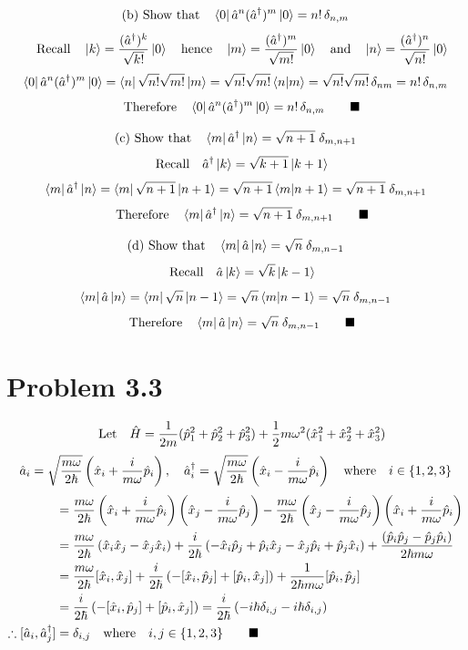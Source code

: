 \documentclass{amsart}
\begin{document}
\[\qq*{(b) Show that}\bra{0}\hat{a}^n(\hat{a}^\dagger)^m\ket{0} =n!\,\delta_{n,m}  \]
\[\qq{Recall} \ket{k}=\frac{(\hat{a}^\dagger)^k}{\sqrt{k!}}\ket{0}\qq{hence} \ket{m}=\frac{(\hat{a}^\dagger)^m}{\sqrt{m!}}\ket{0} \qq{and}\ket{n}=\frac{(\hat{a}^\dagger)^n}{\sqrt{n!}}\ket{0}\]
\[\bra{0}\hat{a}^n(\hat{a}^\dagger)^m\ket{0} =\bra{n}\sqrt{n!}\sqrt{m!}\ket{m}=\sqrt{n!}\sqrt{m!}\bra{n}\ket{m}=\sqrt{n!}\sqrt{m!}\,\delta_{nm}=n!\,\delta_{n,m}\]
\[\qq{Therefore}\bra{0}\hat{a}^n(\hat{a}^\dagger)^m\ket{0} =n!\,\delta_{n,m}\qquad\blacksquare\]

\[\qq*{(c) Show that}\bra{m}\hat{a}^\dagger\ket{n}  =\sqrt{n+1}\;\delta_{m,n+1}  \]
\[\qq{Recall}\hat{a}^\dagger\ket{k}=\sqrt{k+1}\ket{k+1}\]
\[\bra{m}\hat{a}^\dagger\ket{n} = \bra{m}\sqrt{n+1}\ket{n+1}  = \sqrt{n+1}\bra{m}\ket{n+1}=\sqrt{n+1}\;\delta_{m,n+1}\]
\[\qq{Therefore}\bra{m}\hat{a}^\dagger\ket{n}  =\sqrt{n+1}\;\delta_{m,n+1}\qquad\blacksquare\]

\[\qq*{(d) Show that}\bra{m}\hat{a}\ket{n} =\sqrt{n}\;\delta_{m,n-1} \]
\[\qq{Recall}\hat{a}\ket{k}=\sqrt{k}\ket{k-1}\]
\[\bra{m}\hat{a}\ket{n} = \bra{m}\sqrt{n}\ket{n-1}  = \sqrt{n}\bra{m}\ket{n-1}=\sqrt{n}\;\delta_{m,n-1}\]
\[\qq{Therefore}\bra{m}\hat{a}\ket{n}  =\sqrt{n}\;\delta_{m,n-1}\qquad\blacksquare\]

\section*{Problem 3.3}
\[\qq{Let}\hat{H}=\frac{1}{2m}(\hat{p}^2_1+\hat{p}^2_2+\hat{p}^2_3) + \frac{1}{2}m\omega^2(\hat{x}^2_1+\hat{x}^2_2+\hat{x}^2_3) \]
\[\hat{a}_i=\sqrt{\frac{m\omega}{2\hbar}}\left(\hat{x}_i+\frac{i}{m\omega}\hat{p}_i\right)\qcomma\hat{a}^\dagger_i=\sqrt{\frac{m\omega}{2\hbar}}\left(\hat{x}_i-\frac{i}{m\omega}\hat{p}_i\right)\qq{where}i\in\{1,2,3\}\]
\begin{align*}
    [\hat{a}_i,\hat{a}^\dagger_j]&=\frac{m\omega}{2\hbar}\left(\hat{x}_i+\frac{i}{m\omega}\hat{p}_i\right)\left(\hat{x}_j-\frac{i}{m\omega}\hat{p}_j\right)-\frac{m\omega}{2\hbar}\left(\hat{x}_j-\frac{i}{m\omega}\hat{p}_j\right)\left(\hat{x}_i+\frac{i}{m\omega}\hat{p}_i\right)\\
    &=\frac{m\omega}{2\hbar}\left(\hat{x}_i\hat{x}_j-\hat{x}_j\hat{x}_i\right)+\frac{i}{2\hbar}\left(-\hat{x}_i\hat{p}_j+\hat{p}_i\hat{x}_j-\hat{x}_j\hat{p}_i+\hat{p}_j\hat{x}_i\right)+\frac{\left(\hat{p}_i\hat{p}_j-\hat{p}_j\hat{p}_i\right)}{2\hbar m\omega}\\
    &=\frac{m\omega}{2\hbar}[\hat{x}_i,\hat{x}_j]+\frac{i}{2\hbar}\left(-[\hat{x}_i,\hat{p}_j]+[\hat{p}_i,\hat{x}_j]\right)+\frac{1}{2\hbar m\omega}[\hat{p}_i,\hat{p}_j]\\
    &=\frac{i}{2\hbar}\left(-[\hat{x}_i,\hat{p}_j]+[\hat{p}_i,\hat{x}_j]\right)=\frac{i}{2\hbar}\left(-i\hbar\delta_{i,j}-i\hbar\delta_{i,j}\right)\\
    \therefore[\hat{a}_i,\hat{a}^\dagger_j]&=\delta_{i,j}\qq{where}i,j\in\{1,2,3\}\qquad\blacksquare
\end{align*}
\end{document}
